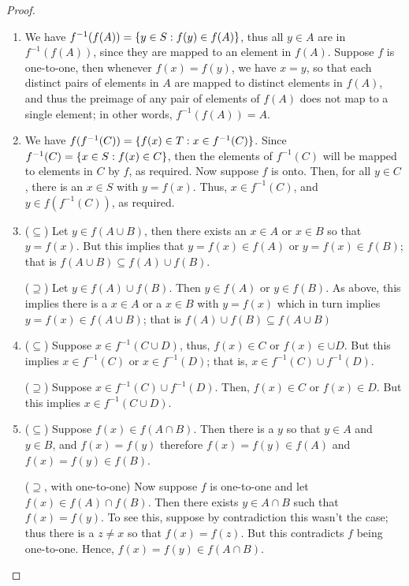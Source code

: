 \begin{proof}
\begin{enumerate}
    \item We have $f^{-1}(f(A))=\{y\in S: f(y)\in f(A)\}$, thus all $y\in A$ are in  $f^{-1}(f(A))$, since they are mapped to an element in $f(A)$.
    Suppose $f$ is one-to-one, then whenever $f(x)=f(y)$, we have $x=y$, so that each distinct pairs of elements in $A$ are mapped to distinct elements in $f(A)$, and thus the preimage of any pair of elements of $f(A)$ does not map to a single element;
    in other words, $f^{-1}(f(A))=A$.
    
    \item We have $f(f^{-1}(C))=\{f(x)\in T: x\in f^{-1}(C)\}$.
    Since $f^{-1}(C)=\{x\in S: f(x)\in C\}$, then the elements of $f^{-1}(C)$ will be mapped to elements in $C$ by $f$, as required.
    Now suppose $f$ is onto.
    Then, for all $y\in C$, there is an $x\in S$ with $y=f(x)$.
    Thus, $x\in f^{-1}(C)$, and $y\in f(f^{-1}(C))$, as required.
    
    \item ($\subseteq$)
    Let $y\in f(A\cup B)$, then there exists an $x\in A$ or $x\in B$ so that $y=f(x)$.
    But this implies that $y=f(x)\in f(A)$ or $y=f(x)\in f(B)$;
    that is $f(A\cup B)\subseteq f(A)\cup f(B)$.

    ($\supseteq$)
    Let $y\in f(A)\cup f(B)$.
    Then $y\in f(A)$ or $y\in f(B)$.
    As above, this implies there is a $x\in A$ or a $x\in B$ with $y=f(x)$ which in turn implies $y=f(x)\in f(A\cup B)$;
    that is $f(A)\cup f(B)\subseteq f(A\cup B)$
    
    \item ($\subseteq$)
    Suppose $x\in f^{-1}(C\cup D)$, thus, $f(x)\in C$ or $f(x)\in\cup D$.
    But this implies $x\in f^{-1}(C)$ or $x\in f^{-1}(D)$;
    that is, $x\in f^{-1}(C)\cup f^{-1}(D)$.

    ($\supseteq$) 
    Suppose $x\in f^{-1}(C)\cup f^{-1}(D)$.
    Then, $f(x)\in C$ or $f(x)\in D$.
    But this implies $x\in f^{-1}(C\cup D)$.
    
    \item ($\subseteq$)
    Suppose $f(x)\in f(A\cap B)$.
    Then there is a $y$ so that $y\in A$ and $y\in B$, and $f(x)=f(y)$ therefore $f(x)=f(y)\in f(A)$ and $f(x)=f(y)\in f(B)$.
    
    ($\supseteq$, with one-to-one)
    Now suppose $f$ is one-to-one and let $f(x)\in f(A)\cap f(B)$.
    Then there exists $y\in A\cap B$ such that $f(x)=f(y)$.
    To see this, suppose by contradiction this wasn't the case;
    thus there is a $z\neq x$ so that $f(x)=f(z)$.
    But this contradicts $f$ being one-to-one.
    Hence, $f(x)=f(y)\in f(A\cap B)$.
    

\end{enumerate}
\end{proof}
